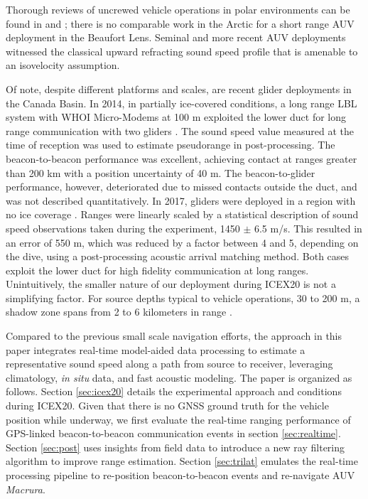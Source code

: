 Thorough reviews of uncrewed vehicle operations in polar environments can be found in \citep{Norgren2014} and \citep{Barker2020}; there is no comparable work in the Arctic for a short range AUV deployment in the Beaufort Lens.
Seminal \citep{brooke1981arcs,jackson1983autonomous,light1989autonomous,bellingham1995auv,hayes2002determining} and more recent AUV deployments \citep{Jakuba2008,Kunz2008,kukulya2010under,plueddemann_autonomous_2012,timmermans2013scales,fossum2021adaptive} witnessed the classical upward refracting sound speed profile that is amenable to an isovelocity assumption.

Of note, despite different platforms and scales, are recent glider deployments in the Canada Basin.
In 2014, in partially ice-covered conditions, a long range LBL system with WHOI Micro-Modems at 100 m exploited the lower duct for long range communication with two gliders \citep{Freitag2016,Webster2015}.
The sound speed value measured at the time of reception was used to estimate pseudorange in post-processing.
The beacon-to-beacon performance was excellent, achieving contact at ranges greater than 200 km with a position uncertainty of 40 m.
The beacon-to-glider performance, however, deteriorated due to missed contacts outside the duct, and was not described quantitatively.
In 2017, gliders were deployed in a region with no ice coverage \citep{Graupe2019}.
Ranges were linearly scaled by a statistical description of sound speed observations taken during the experiment, 1450 $\pm$ 6.5 m/s.
This resulted in an error of 550 m, which was reduced by a factor between 4 and 5, depending on the dive, using a post-processing acoustic arrival matching method.
Both cases exploit the lower duct for high fidelity communication at long ranges.
Unintuitively, the smaller nature of our deployment during ICEX20 is not a simplifying factor.
For source depths typical to vehicle operations, 30 to 200 m, a shadow zone spans from 2 to 6 kilometers in range \citep{Schmidt2016}.

Compared to the previous small scale navigation efforts, the approach in this paper integrates real-time model-aided data processing to estimate a representative sound speed along a path from source to receiver, leveraging climatology, \textit{in situ} data, and fast acoustic modeling.
The paper is organized as follows.
Section \ref{sec:icex20} details the experimental approach and conditions during ICEX20.
Given that there is no GNSS ground truth for the vehicle position while underway, we first evaluate the real-time ranging performance of GPS-linked beacon-to-beacon communication events in section \ref{sec:realtime}.
Section \ref{sec:post} uses insights from field data to introduce a new ray filtering algorithm to improve range estimation.
Section \ref{sec:trilat} emulates the real-time processing pipeline to re-position beacon-to-beacon events and re-navigate AUV \emph{Macrura}.

